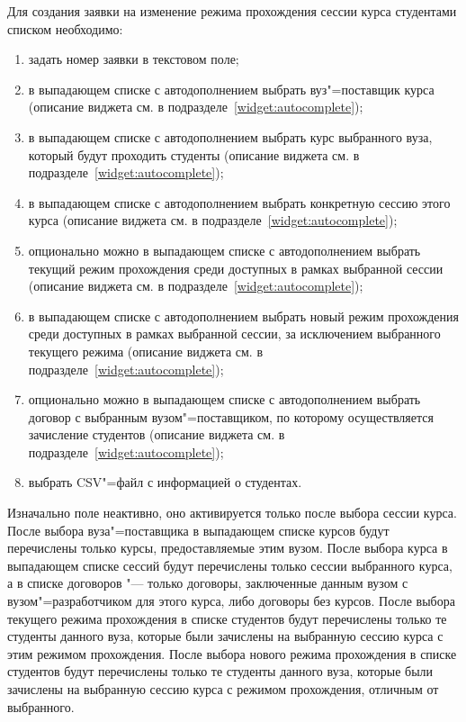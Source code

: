 Для создания заявки на изменение режима прохождения сессии курса студентами списком необходимо:
\begin{enumerate}
	\item задать номер заявки в текстовом поле;
	\item в выпадающем списке с автодополнением выбрать вуз"=поставщик курса
	(описание виджета см. в подразделе~\ref{widget:autocomplete});
	\item в выпадающем списке с автодополнением выбрать курс выбранного вуза, который будут проходить студенты 
	(описание виджета см. в подразделе~\ref{widget:autocomplete});
	\item в выпадающем списке с автодополнением выбрать конкретную сессию этого курса 
	(описание виджета см. в подразделе~\ref{widget:autocomplete});
	\item опционально можно в выпадающем списке с автодополнением выбрать текущий режим прохождения среди 
	доступных в рамках выбранной сессии (описание виджета см. в подразделе~\ref{widget:autocomplete});
	\item в выпадающем списке с автодополнением выбрать новый режим прохождения среди доступных в рамках выбранной 
	сессии, за исключением выбранного текущего режима (описание виджета см. в подразделе~\ref{widget:autocomplete});
	\item опционально можно в выпадающем списке с автодополнением выбрать договор с выбранным вузом"=поставщиком, 
	по которому осуществляется зачисление студентов (описание виджета см. в подразделе~\ref{widget:autocomplete});
	\item выбрать CSV"=файл с информацией о студентах.
\end{enumerate}

Изначально поле  неактивно, оно активируется только после выбора сессии курса.
После выбора вуза"=поставщика в выпадающем списке курсов будут перечислены только курсы, предоставляемые этим вузом.
После выбора курса в выпадающем списке сессий будут перечислены только сессии выбранного курса, 
а в списке договоров "--- только договоры, заключенные данным вузом с вузом"=разработчиком для этого курса, 
либо договоры без курсов.
После выбора текущего режима прохождения в списке студентов будут перечислены только те студенты данного вуза, 
которые были зачислены на выбранную сессию курса с этим режимом прохождения.
После выбора нового режима прохождения в списке студентов будут перечислены только те студенты данного вуза, 
которые были зачислены на выбранную сессию курса с режимом прохождения, отличным от выбранного.


